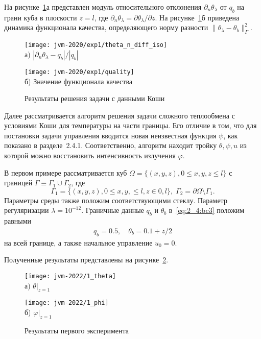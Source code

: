На рисунке~\ref{fig:4_4:0}а представлен модуль относительного
отклонения $\partial_n\theta_\lambda$ от $q_b$ на грани куба в плоскости $z=l$,
где $\partial_n\theta_\lambda=\partial\theta_\lambda/\partial z$.
На рисунке~\ref{fig:4_4:0}б приведена динамика функционала качества, определяющего норму
разности $\|\theta_\lambda -\theta_b\|^2_\Gamma$.
\begin{figure}[h!t]
    \begin{minipage}[b][][b]{0.49\linewidth}
        \centering
        \texttt{[image: jvm-2020/exp1/theta\_n\_diff\_iso]}
        \\ а) $|\partial_n\theta_\lambda-q_b|/|q_b|$
    \end{minipage}
    \hfill
    \begin{minipage}[b][][b]{0.49\linewidth}
        \centering
        \texttt{[image: jvm-2020/exp1/quality]}
        \\ б) Значение функционала качества
    \end{minipage}
    \caption{Результаты решения задачи с данными Коши}
    \label{fig:4_4:0}
\end{figure}


Далее рассматривается алгоритм решения задачи сложного теплообмена с условиями Коши для
температуры на части границы.
Его отличие в том, что для постановки задачи управления вводится новая неизвестная функция $\psi$,
как показано в разделе~2.4.1.
Соответственно, алгоритм находит тройку $\theta, \psi, u$ из которой можно
восстановить интенсивность излучения $\varphi$.


В первом примере рассматривается куб $\Omega = \{ (x, y, z), 0 \leq x,y,z \leq l \}$ с границей
$\Gamma \equiv \Gamma_1 \cup \Gamma_2$, где
\[
    \Gamma_1 = \{(x, y, z), 0 \leq x,y, \leq l, z \in 0, l\}, \;
    \Gamma_2 = \partial \Omega \setminus \Gamma_1.
\]
Параметры среды также положим соответствующими стеклу.
Параметр регуляризации $\lambda=10^{-12}$.
Граничные данные $q_b$ и $\theta_b$ в~\eqref{eq:2_4:bc3} положим равными
\begin{gather*}
    q_b = 0.5, \quad
    \theta_b = 0.1 + z/2
\end{gather*}
на всей границе, а также начальное управление $u_0 = 0$.


Полученные результаты представлены на рисунке~\ref{fig:4_4:5}.
\begin{figure}[h!t]
    \begin{minipage}[b][][b]{0.49\linewidth}
        \centering
        \texttt{[image: jvm-2022/1\_theta]}
        \\ а) $\theta|_{z=1}$
    \end{minipage}
    \hfill
    \begin{minipage}[b][][b]{0.49\linewidth}
        \centering
        \texttt{[image: jvm-2022/1\_phi]}
        \\ б) $\varphi|_{z=1}$
    \end{minipage}
    \caption{Результаты первого эксперимента}
    \label{fig:4_4:5}
\end{figure}


